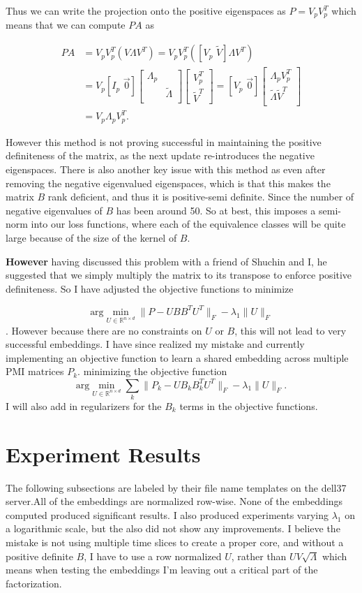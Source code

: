 \documentclass{report}
\newcommand{\argmin}[2]{\text{arg}\min_{#1}#2}
\newcommand{\partitionedV}{[V_p \,\,\tilde{V}]}
\newcommand{\BigLambda}{\begin{bmatrix}
													\Lambda_p & \\
													&\tilde{\Lambda}\\
												\end{bmatrix}}
\newcommand{\vertPartitionedV}{\begin{bmatrix}
																 V_p^T \\
																 \tilde{V}^T
															 \end{bmatrix}}
\begin{document}
  Thus we can write the projection onto the positive eigenspaces as $ P = V_pV_p^T $ which means that we can compute $ PA $ as 
  
  \begin{align*}
  	PA &= V_pV_p^T(V\Lambda V^T) = V_pV_p^T(\partitionedV\Lambda V^T) \\
  	   &= V_p [I_p \,\,\vec{0}]\BigLambda \vertPartitionedV 
  	    = [V_p \,\, \vec{0}] \begin{bmatrix}
  	                           \Lambda_p V_p^T \\ 
  	                           \tilde{\Lambda} \tilde{V}^T\\ 
 											  	    \end{bmatrix}\\
       &= V_p \Lambda_p V_p^T.
  \end{align*}
	
	However this method is not proving successful in maintaining the positive definiteness of the matrix, as the next update re-introduces the negative eigenspaces. There is also another key issue with this method as even after removing the negative eigenvalued eigenspaces, which is that this makes the matrix $ B $ rank deficient, and thus it is positive-semi definite. Since the number of negative eigenvalues of $ B $ has been around 50. So at best, this imposes a semi-norm into our loss functions, where each of the equivalence classes will be quite large because of the size of the kernel of $ B $.  
	
	\textbf{However} having discussed this problem with a friend of Shuchin and I, he suggested that we simply multiply the matrix to its transpose to enforce positive definiteness. So I have adjusted the objective functions to minimize 
	
	\[ 
	\argmin{U \in \mathbb{R}^{n \times d}}{\|P - UBB^TU^T\|_{F} - \lambda_1\|U\|_{F}}
	\].
	However because there are no constraints on $ U $ or $ B $, this will not lead to very successful embeddings. I have since realized my mistake and currently implementing an objective function to learn a shared embedding across multiple PMI matrices $ P_k $. minimizing the objective function 
	\[ 
	  \argmin{U \in \mathbb{R}^{n \times d}}\displaystyle \sum_{k}{\|P_k} - UB_kB_k^TU^T\|_{F} - \lambda_1\|U\|_{F}.
	\]
	I will also add in regularizers for the $ B_k $ terms in the objective functions. 
	
	
	\section{Experiment Results}
	The following subsections are labeled by their file name templates on the dell37 server.All of the embeddings are normalized row-wise. None of the embeddings computed produced significant results. 
	I also produced experiments varying $ \lambda_1 $ on a logarithmic scale, but the also did not show any improvements. I believe the mistake is not using multiple time slices to create a proper core, and without a positive definite $ B $, I have to use a row normalized $ U $, rather than $ UV\sqrt{\Lambda} $ which means when testing the embeddings I'm leaving out a critical part of the factorization. 
\end{document}
